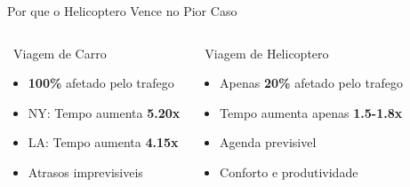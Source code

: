 \documentclass[aspectratio=169,9pt]{beamer}
\begin{document}
\begin{frame}{Por que o Helicoptero Vence no Pior Caso}
\begin{columns}
\begin{block}{\faCarSide\ Viagem de Carro}
\begin{itemize}
    \item \textcolor{revoRed}{\textbf{100\%}} afetado pelo trafego
    \item NY: Tempo aumenta \textcolor{revoRed}{\textbf{5.20x}}
    \item LA: Tempo aumenta \textcolor{revoRed}{\textbf{4.15x}}
    \item Atrasos imprevisiveis
\end{itemize}
\end{block}

\begin{block}{\faHelicopter\ Viagem de Helicoptero}
\begin{itemize}
    \item Apenas \textcolor{revoGreen}{\textbf{20\%}} afetado pelo trafego
    \item Tempo aumenta apenas \textcolor{revoGreen}{\textbf{1.5-1.8x}}
    \item Agenda previsivel
    \item Conforto e produtividade
\end{itemize}
\end{block}
\end{columns}

\vspace{0.5em}
\begin{center}
\end{center}
\end{frame}
\end{document}
